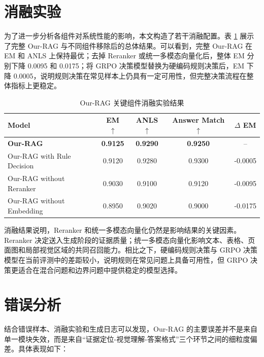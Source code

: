 \section{消融实验}

为了进一步分析各组件对系统性能的影响，本文构造了若干消融配置。表 \ref{tab:ablation_results} 展示了完整 Our-RAG 与不同组件移除后的总体结果。可以看到，完整 Our-RAG 在 EM 和 ANLS 上保持最优；去掉 Reranker 或统一多模态向量化后，整体 EM 分别下降 0.0095 和 0.0175；将 GRPO 决策模型替换为硬编码规则决策后，EM 下降 0.0005，说明规则决策在常见样本上仍具有一定可用性，但完整决策流程在整体指标上更稳定。

\begin{table}[htbp]
  \centering
  \caption{Our-RAG 关键组件消融实验结果}
  \label{tab:ablation_results}
  \small
  \setlength{\tabcolsep}{6pt}
  \begin{tabular}{p{} c c c c}
    \toprule
    Model & EM $\uparrow$ & ANLS $\uparrow$ & Answer Match $\uparrow$ & $\Delta$ EM \\
    \midrule
    \textbf{Our-RAG} & \textbf{0.9125} & \textbf{0.9290} & \textbf{0.9250} & -- \\
    Our-RAG with Rule Decision & 0.9120 & 0.9280 & 0.9300 & -0.0005 \\
    Our-RAG without Reranker & 0.9030 & 0.9100 & 0.9120 & -0.0095 \\
    Our-RAG without Embedding & 0.8950 & 0.9020 & 0.9000 & -0.0175 \\
    \bottomrule
  \end{tabular}
\end{table}

消融结果说明，Reranker 和统一多模态向量化仍然是影响结果的关键因素。Reranker 决定送入生成阶段的证据质量；统一多模态向量化影响文本、表格、页面图和局部视觉区域的共同召回能力。相比之下，硬编码规则决策与 GRPO 决策模型在当前评测中的差距较小，说明规则在常见问题上具备可用性，但 GRPO 决策更适合在混合问题和边界问题中提供稳定的模型选择。

\setcounter{section}{3}
\section{错误分析}

结合错误样本、消融实验和生成日志可以发现，Our-RAG 的主要误差并不是来自单一模块失效，而是来自“证据定位-视觉理解-答案格式”三个环节之间的细粒度偏差。具体表现如下：

